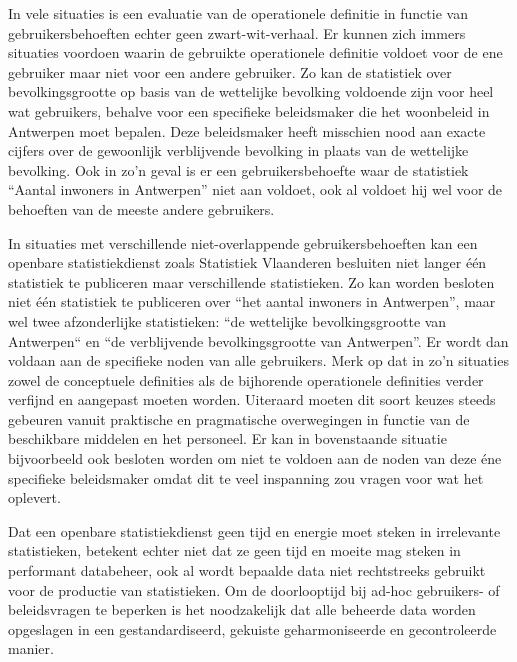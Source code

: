 \documentclass[\mainfiledir/00_handleiding_statistiekproductie.tex]{subfiles}
\begin{document}
In vele situaties is een evaluatie van de operationele definitie in functie van gebruikersbehoeften echter geen zwart-wit-verhaal. Er kunnen zich immers situaties voordoen waarin de gebruikte operationele definitie voldoet voor de ene gebruiker maar niet voor een andere gebruiker. Zo kan de statistiek over bevolkingsgrootte op basis van de wettelijke bevolking voldoende zijn voor heel wat gebruikers, behalve voor een specifieke beleidsmaker die het woonbeleid in Antwerpen moet bepalen. Deze beleidsmaker heeft misschien nood aan exacte cijfers over de gewoonlijk verblijvende bevolking in plaats van de wettelijke bevolking. Ook in zo’n geval is er een gebruikersbehoefte waar de statistiek ``Aantal inwoners in Antwerpen'' niet aan voldoet, ook al voldoet hij wel voor de behoeften van de meeste andere gebruikers.

In situaties met verschillende niet-overlappende gebruikersbehoeften kan een openbare statistiekdienst zoals Statistiek Vlaanderen besluiten niet langer één statistiek te publiceren maar verschillende statistieken. Zo kan worden besloten niet één statistiek te publiceren over ``het aantal inwoners in Antwerpen'', maar wel twee afzonderlijke statistieken: ``de wettelijke bevolkingsgrootte van Antwerpen`` en ``de verblijvende bevolkingsgrootte van Antwerpen''. Er wordt dan voldaan aan de specifieke noden van alle gebruikers. Merk op dat in zo'n situaties zowel de conceptuele definities als de bijhorende operationele definities verder verfijnd en aangepast moeten worden. Uiteraard moeten dit soort keuzes steeds gebeuren vanuit praktische en pragmatische overwegingen in functie van de beschikbare middelen en het personeel. Er kan in bovenstaande situatie bijvoorbeeld ook besloten worden om niet te voldoen aan de noden van deze éne specifieke beleidsmaker omdat dit te veel inspanning zou vragen voor wat het oplevert.

\begin{info}
Dat een openbare statistiekdienst geen tijd en energie moet steken in irrelevante statistieken, betekent echter niet dat ze geen tijd en moeite mag steken in performant databeheer, ook al wordt bepaalde data niet rechtstreeks gebruikt voor de productie van statistieken. Om de doorlooptijd bij ad-hoc gebruikers- of beleidsvragen te beperken is het noodzakelijk dat alle beheerde data worden opgeslagen in een gestandardiseerd, gekuiste geharmoniseerde en gecontroleerde manier. 
\end{info}



	
\end{document}
